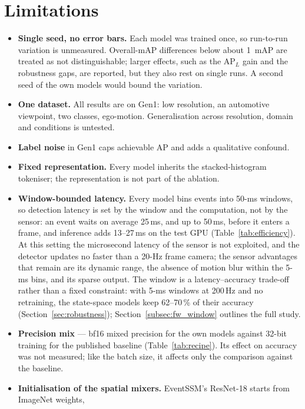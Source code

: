 \documentclass[11pt, a4paper]{report}
\begin{document}
\section{Limitations}
\label{sec:limitations}
\begin{itemize}
  \item \textbf{Single seed, no error bars.} Each model was trained once, so run-to-run variation is
        unmeasured. Overall-mAP differences below about 1~mAP are treated as not distinguishable; larger
        effects, such as the $\mathrm{AP}_L$ gain and the robustness gaps, are reported, but they also rest
        on single runs. A second seed of the own models would bound the variation.
  \item \textbf{One dataset.} All results are on Gen1: low resolution, an automotive viewpoint, two classes, ego-motion.
        Generalisation across resolution, domain and conditions is untested.
  \item \textbf{Label noise} in Gen1 caps achievable AP and adds a qualitative confound.
  \item \textbf{Fixed representation.} Every model inherits the stacked-histogram tokeniser; the
        representation is not part of the ablation.
  \item \textbf{Window-bounded latency.} Every model bins events into 50-ms windows, so detection latency
        is set by the window and the computation, not by the sensor: an event waits on average 25\,ms, and
        up to 50\,ms, before it enters a frame, and inference adds 13--27\,ms on the test GPU
        (Table~\ref{tab:efficiency}). At this setting the microsecond latency of the sensor is not
        exploited, and the detector updates no faster than a 20-Hz frame camera; the sensor advantages that
        remain are its dynamic range, the absence of motion blur within the 5-ms bins, and its sparse output.
        The window is a latency--accuracy trade-off rather than a fixed constraint: with 5-ms windows at
        200\,Hz and no retraining, the state-space models keep 62--70\,\% of their accuracy
        (Section~\ref{sec:robustness}); Section~\ref{subsec:fw_window} outlines the full study.
  \item \textbf{Precision mix} --- bf16 mixed precision for the own models against 32-bit training for
        the published baseline (Table~\ref{tab:recipe}). Its effect on accuracy was not measured; like the
        batch size, it affects only the comparison against the baseline.
  \item \textbf{Initialisation of the spatial mixers.} EventSSM's ResNet-18 starts from ImageNet weights,

\end{itemize}
\end{document}
